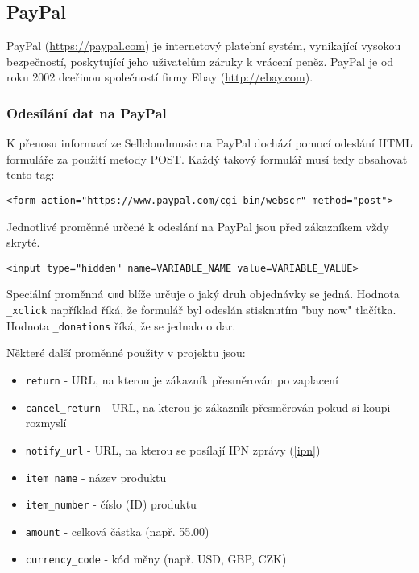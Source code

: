 \documentclass[12pt]{article}
\begin{document}
\subsection{PayPal}

PayPal (\url{https://paypal.com}) je internetový platební systém, vynikající vysokou bezpečností, poskytující jeho uživatelům záruky k vrácení peněz.
PayPal je od roku 2002 dceřinou společností firmy Ebay (\url{http://ebay.com}).

\subsubsection{Odesílání dat na PayPal} \label{ppdata}

K přenosu informací ze Sellcloudmusic na PayPal dochází pomocí odeslání HTML formuláře za použití metody POST. Každý takový formulář musí tedy obsahovat tento tag:

\lstset{language=HTML}
\begin{lstlisting}
<form action="https://www.paypal.com/cgi-bin/webscr" method="post">
\end{lstlisting}

Jednotlivé proměnné určené k odeslání na PayPal jsou před zákazníkem vždy skryté.
\begin{lstlisting}
<input type="hidden" name=VARIABLE_NAME value=VARIABLE_VALUE>
\end{lstlisting}

Speciální proměnná \texttt{cmd} blíže určuje o jaký druh objednávky se jedná. Hodnota \texttt{\_xclick} například říká, že formulář byl odeslán stisknutím "buy now" tlačítka. Hodnota \texttt{\_donations} říká, že se jednalo o dar.

Některé další proměnné použity v projektu jsou:

\begin{itemize}
\item{\texttt{return}} - URL, na kterou je zákazník přesměrován po zaplacení
\item{\texttt{cancel\_return}} - URL, na kterou je zákazník přesměrován pokud si koupi rozmyslí
\item{\texttt{notify\_url}} - URL, na kterou se posílají IPN zprávy (\ref{ipn})
\item{\texttt{item\_name}} - název produktu
\item{\texttt{item\_number}} - číslo (ID) produktu
\item{\texttt{amount}} - celková částka (např. 55.00)
\item{\texttt{currency\_code}} - kód měny (např. USD, GBP, CZK)
\end{itemize}
\end{document}
